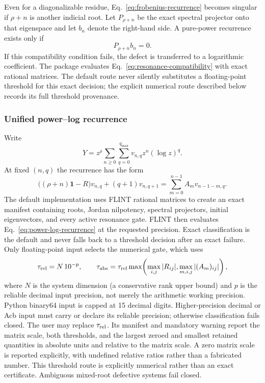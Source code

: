 \documentclass[11pt]{article}
\newcommand{\Id}{\mathbf 1}
\renewcommand{\_}{\origunderscore\allowbreak}
\begin{document}
Even for a diagonalizable residue, Eq.~\eqref{eq:frobenius-recurrence} becomes singular if
$\rho+n$ is another indicial root.  Let $P_{\rho+n}$ be the exact spectral projector onto
that eigenspace and let $b_n$ denote the right-hand side.  A pure-power recurrence exists
only if
\begin{equation}
  P_{\rho+n}b_n=0.
  \label{eq:resonance-compatibility}
\end{equation}
If this compatibility condition fails, the defect is transferred to a logarithmic
coefficient.  The package evaluates Eq.~\eqref{eq:resonance-compatibility} with exact
rational matrices.  The default route never silently substitutes a floating-point threshold
for this exact decision; the explicit numerical route described below records its full
threshold provenance.

\subsubsection{Unified power--log recurrence}

Write
\begin{equation}
  Y=z^\rho\sum_{n\geq0}\sum_{q=0}^{q_{\max}}
  v_{n,q}z^n(\log z)^q.
\end{equation}
At fixed $(n,q)$ the recurrence has the form
\begin{equation}
  \bigl((\rho+n)\Id-R\bigr)v_{n,q}
  +(q+1)v_{n,q+1}
  =\sum_{m=0}^{n-1}A_m v_{n-1-m,q}.
  \label{eq:power-log-recurrence}
\end{equation}
The default implementation uses FLINT rational matrices to create an exact manifest
containing roots, Jordan nilpotency, spectral projectors, initial eigenvectors, and every
active resonance gate.  FLINT then evaluates Eq.~\eqref{eq:power-log-recurrence} at the
  requested precision.  Exact classification is the default and never falls back to a
  threshold decision after an exact failure.  Only floating-point input selects the
  numerical gate, which uses
\begin{equation}
  \tau_{\rm rel}=N\,10^{-p},
  \qquad
  \tau_{\rm abs}=\tau_{\rm rel}
  \max\!\left(\max_{i,j}|R_{ij}|,\max_{m,i,j}|(A_m)_{ij}|\right),
  \label{eq:numerical-log-threshold}
\end{equation}
where $N$ is the system dimension (a conservative rank upper bound) and $p$ is the reliable
decimal input precision, not merely the arithmetic working precision.  Python binary64
input is capped at 15 decimal digits.  Higher-precision decimal or Acb input must carry or
declare its reliable precision; otherwise classification fails closed.  The user may replace
$\tau_{\rm rel}$.  Its manifest and mandatory warning report the matrix scale, both
thresholds, and the largest zeroed and smallest retained quantities in absolute units and
relative to the matrix scale.  A zero matrix scale is reported explicitly, with undefined
relative ratios rather than a fabricated number.  This threshold route is explicitly
 numerical rather than an exact certificate.  Ambiguous mixed-root defective systems fail
 closed.
\end{document}
